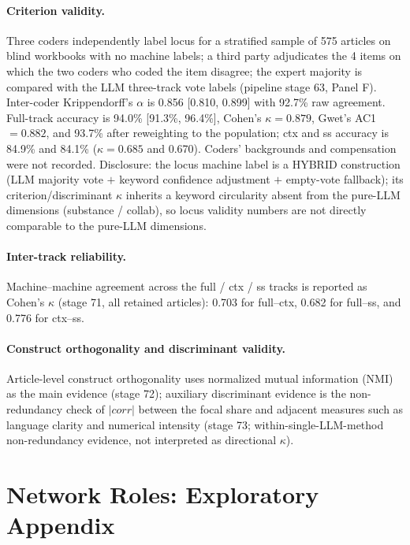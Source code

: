 \paragraph{Criterion validity.}
Three coders independently label locus for a stratified sample of 575 articles on blind
workbooks with no machine labels; a third party adjudicates the 4 items on which the two
coders who coded the item disagree; the expert majority is compared with the LLM
three-track vote labels (pipeline stage 63, Panel F). Inter-coder Krippendorff's $\alpha$
is 0.856 [0.810, 0.899] with 92.7\% raw agreement. Full-track accuracy is 94.0\%
[91.3\%, 96.4\%], Cohen's $\kappa = 0.879$, Gwet's AC1 $= 0.882$, and 93.7\% after
reweighting to the population; ctx and ss accuracy is 84.9\% and 84.1\%
($\kappa = 0.685$ and 0.670). Coders' backgrounds and compensation were not recorded. Disclosure: the locus machine label is a HYBRID construction (LLM majority
vote $+$ keyword confidence adjustment $+$ empty-vote fallback); its
criterion/discriminant $\kappa$ inherits a keyword circularity absent from the pure-LLM
dimensions (substance / collab), so locus validity numbers are not directly comparable
to the pure-LLM dimensions.

\paragraph{Inter-track reliability.}
Machine--machine agreement across the full / ctx / ss tracks is reported as Cohen's
$\kappa$ (stage 71, all retained articles): 0.703 for full--ctx, 0.682 for
full--ss, and 0.776 for ctx--ss.

\paragraph{Construct orthogonality and discriminant validity.}
Article-level construct orthogonality uses normalized mutual information (NMI) as the
main evidence (stage 72); auxiliary discriminant evidence is the non-redundancy check of
$|corr|$ between the focal share and adjacent measures such as language clarity and
numerical intensity (stage 73; within-single-LLM-method non-redundancy evidence, not
interpreted as directional $\kappa$). 

\section{Network Roles: Exploratory Appendix}\label{app:network}


